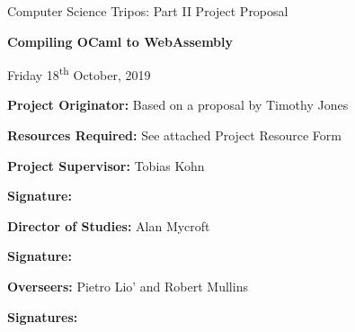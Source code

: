 \thispagestyle{empty}
	
	\medskip
	\medskip
	
	\vfil
	
	\centerline{\large Computer Science Tripos: Part II Project Proposal}
	\vspace{0.4in}
	\centerline{\Large\bf Compiling OCaml to WebAssembly}
	\vspace{0.3in}
	\centerline{\large{Friday 18\textsuperscript{th} October, 2019}}
	
	\vfil
	
	{\bf Project Originator:} Based on a proposal by Timothy Jones
	
	\vspace{0.1in}
	
	{\bf Resources Required:} See attached Project Resource Form
	
	\vspace{0.5in}
	
	{\bf Project Supervisor:} Tobias Kohn
	
	\vspace{0.2in}
	
	{\bf Signature:}
	
	\vspace{0.5in}
	
	{\bf Director of Studies:}  Alan Mycroft
	
	\vspace{0.2in}
	
	{\bf Signature:}
	
	\vspace{0.5in}
	
	{\bf Overseers:} Pietro Lio' and Robert Mullins
	
	\vspace{0.2in}
	
	{\bf Signatures:} 
	
	\vfil
	\eject
	
	
